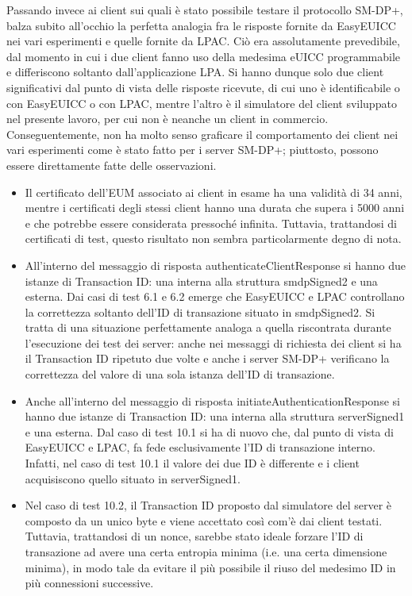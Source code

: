 \documentclass[10pt, oneside]{book}
\begin{document}
\noindent Passando invece ai client sui quali è stato possibile testare il protocollo SM-DP+, balza subito all'occhio la perfetta analogia fra le risposte fornite da EasyEUICC nei vari esperimenti e quelle fornite da LPAC. Ciò era assolutamente prevedibile, dal momento in cui i due client fanno uso della medesima eUICC programmabile e differiscono soltanto dall'applicazione LPA. Si hanno dunque solo due client significativi dal punto di vista delle risposte ricevute, di cui uno è identificabile o con EasyEUICC o con LPAC, mentre l'altro è il simulatore del client sviluppato nel presente lavoro, per cui non è neanche un client in commercio. Conseguentemente, non ha molto senso graficare il comportamento dei client nei vari esperimenti come è stato fatto per i server SM-DP+; piuttosto, possono essere direttamente fatte delle osservazioni.
\begin{itemize}
\item Il certificato dell'EUM associato ai client in esame ha una validità di 34 anni, mentre i certificati degli stessi client hanno una durata che supera i 5000 anni e che potrebbe essere considerata pressoché infinita. Tuttavia, trattandosi di certificati di test, questo risultato non sembra particolarmente degno di nota.
\item All'interno del messaggio di risposta authenticateClientResponse si hanno due istanze di Transaction ID: una interna alla struttura smdpSigned2 e una esterna. Dai casi di test 6.1 e 6.2 emerge che EasyEUICC e LPAC controllano la correttezza soltanto dell'ID di transazione situato in smdpSigned2. Si tratta di una situazione perfettamente analoga a quella riscontrata durante l'esecuzione dei test dei server: anche nei messaggi di richiesta dei client si ha il Transaction ID ripetuto due volte e anche i server SM-DP+ verificano la correttezza del valore di una sola istanza dell'ID di transazione.
\item Anche all'interno del messaggio di risposta initiateAuthenticationResponse si hanno due istanze di Transaction ID: una interna alla struttura serverSigned1 e una esterna. Dal caso di test 10.1 si ha di nuovo che, dal punto di vista di EasyEUICC e LPAC, fa fede esclusivamente l'ID di transazione interno. Infatti, nel caso di test 10.1 il valore dei due ID è differente e i client acquisiscono quello situato in serverSigned1.
\item Nel caso di test 10.2, il Transaction ID proposto dal simulatore del server è composto da un unico byte e viene accettato così com'è dai client testati. Tuttavia, trattandosi di un nonce, sarebbe stato ideale forzare l'ID di transazione ad avere una certa entropia minima (i.e. una certa dimensione minima), in modo tale da evitare il più possibile il riuso del medesimo ID in più connessioni successive.

\end{itemize}
\end{document}
